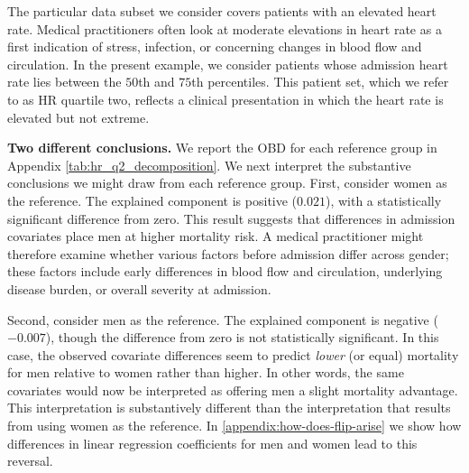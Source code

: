 The particular data subset we consider covers patients with an elevated heart rate.
Medical practitioners often look at moderate elevations in heart rate as a first indication of stress, infection, or concerning changes in blood flow and circulation. In the present example, we consider patients whose admission heart rate lies between the $50$th and $75$th percentiles. This patient set, which we refer to as HR quartile two, reflects a clinical presentation in which the heart rate is elevated but not extreme.

\textbf{Two different conclusions.} 
We report the OBD for each reference group in Appendix \cref{tab:hr_q2_decomposition}. We next interpret the substantive conclusions
we might draw from each reference group. First, consider women as the reference. The explained component is positive ($0.021$), with a statistically significant difference from zero.
This result suggests that differences in admission covariates place men at higher mortality risk. A medical practitioner might therefore examine whether various factors before admission differ across gender; these factors include early differences in blood flow and circulation, underlying disease burden, or overall severity at admission.

Second, consider men as the reference. The explained component is negative ($-0.007$), though the difference from zero is not statistically significant. In this case, the observed covariate differences seem to predict \emph{lower} (or equal) mortality for men relative to women rather than higher. In other words, the same covariates would now be interpreted as offering men a slight mortality advantage. This interpretation is substantively different than the interpretation that results from using women as the reference. 
In \cref{appendix:how-does-flip-arise} we show how differences in linear regression coefficients for men and women lead to this reversal.

